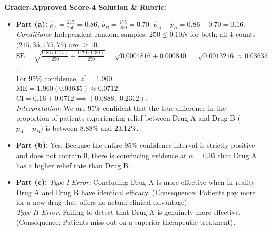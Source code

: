 \begin{frqrubricbox}
\textbf{Grader-Approved Score-4 Solution \& Rubric:}
\begin{itemize}[leftmargin=1.2em]
  \item \textbf{Part (a):} $\hat{p}_A = \frac{215}{250} = 0.86$, $\hat{p}_B = \frac{175}{250} = 0.70$.
  $\hat{p}_A - \hat{p}_B = 0.86 - 0.70 = 0.16$.\\
  \textit{Conditions:} Independent random samples; $250 \le 0.10N$ for both; all 4 counts ($215, 35, 175, 75$) are $\ge 10$.\\
  $\text{SE} = \sqrt{\frac{0.86(0.14)}{250} + \frac{0.70(0.30)}{250}} = \sqrt{0.0004816 + 0.000840} = \sqrt{0.0013216} \approx 0.03635$.\\
  For 95\% confidence, $z^* = 1.960$.\\
  $\text{ME} = 1.960(0.03635) \approx 0.0712$.\\
  $\text{CI} = 0.16 \pm 0.0712 \implies \mathbf{(0.0888, \; 0.2312)}$.\\
  \textit{Interpretation:} We are 95\% confident that the true difference in the proportion of patients experiencing relief between Drug A and Drug B ($p_A - p_B$) is between 8.88\% and 23.12\%.
  \item \textbf{Part (b):} Yes. Because the entire 95\% confidence interval is strictly positive and does not contain 0, there is convincing evidence at $\alpha = 0.05$ that Drug A has a higher relief rate than Drug B.
  \item \textbf{Part (c):}
  \textit{Type I Error:} Concluding Drug A is more effective when in reality Drug A and Drug B have identical efficacy. (Consequence: Patients pay more for a new drug that offers no actual clinical advantage).\\
  \textit{Type II Error:} Failing to detect that Drug A is genuinely more effective. (Consequence: Patients miss out on a superior therapeutic treatment).
\end{itemize}
\end{frqrubricbox}

